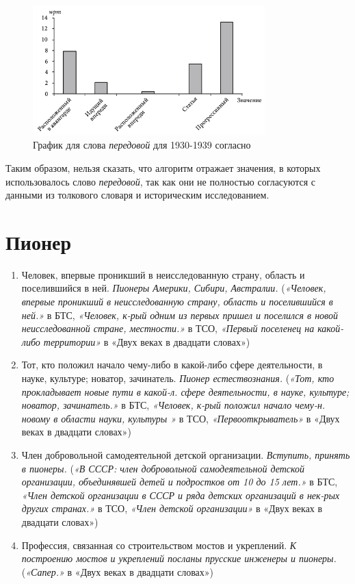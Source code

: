 \begin{figure}[H]
    \centering %
    \includegraphics[width=0.8\textwidth]{img/book/peredovoj/1930-1939}
    \caption{График для слова \textit{передовой} для 1930-1939 согласно~\cite{TwoCenturies}}
    \label{fig:TwoCenturiesPeredovoj2}
\end{figure}

Таким образом, нельзя сказать, что алгоритм отражает значения, в которых использовалось
слово \textit{передовой}, так как они не полностью согласуются
с данными из толкового словаря и историческим исследованием.

\section*{Пионер}

\begin{enumerate}
    \item Человек, впервые проникший в неисследованную страну, область и поселившийся в ней. \textit{Пионеры Америки, Сибири, Австралии.}
(\textit{«Человек, впервые проникший в неисследованную страну, область и поселившийся в ней.»} в БТС,
\textit{«Человек, к-рый одним из первых пришел и поселился в новой неисследованной стране, местности.»} в ТСО,
\textit{«Первый поселенец на какой-либо территории»} в «Двух веках в двадцати словах»)

    \item Тот, кто положил начало чему-либо в какой-либо сфере деятельности, в науке, культуре; новатор, зачинатель. \textit{Пионер естествознания.}
(\textit{«Тот, кто прокладывает новые пути в какой-л. сфере деятельности, в науке, культуре; новатор, зачинатель.»} в БТС,
\textit{«Человек, к-рый положил начало чему-н. новому в области науки, культуры »} в ТСО,
\textit{«Первооткрыватель»} в «Двух веках в двадцати словах»)

    \item Член добровольной самодеятельной детской организации. \textit{Вступить, принять в пионеры.}
(\textit{«В СССР: член добровольной самодеятельной детской организации, объединявшей детей и подростков от 10 до 15 лет.»} в БТС,
\textit{«Член детской организации в СССР и ряда детских организаций в нек-рых других странах.»} в ТСО,
\textit{«Член детской организации»} в «Двух веках в двадцати словах»)

    \item Профессия, связанная со строительством мостов и укреплений. \textit{К построению мостов и укреплений посланы прусские инженеры и пионеры.}
(\textit{«Сапер.»} в «Двух веках в двадцати словах»)
\end{enumerate}

